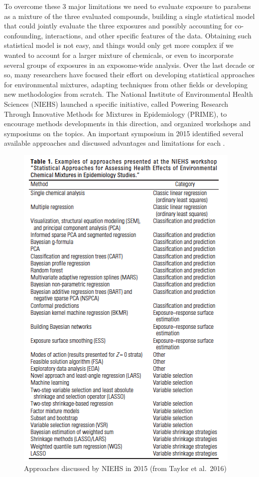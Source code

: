 \documentclass[
]{book}
\begin{document}
To overcome these 3 major limitations we need to evaluate exposure to parabens as a mixture of the three evaluated compounds, building a single statistical model that could jointly evaluate the three exposures and possibly accounting for co-confounding, interactions, and other specific features of the data. Obtaining such statistical model is not easy, and things would only get more complex if we wanted to account for a larger mixture of chemicals, or even to incorporate several groups of exposures in an exposome-wide analysis. Over the last decade or so, many researchers have focused their effort on developing statistical approaches for environmental mixtures, adapting techniques from other fields or developing new methodologies from scratch. The National Institute of Environmental Health Sciences (NIEHS) launched a specific initiative, called Powering Research Through Innovative Methods for Mixtures in Epidemiology (PRIME), to encourage methods developments in this direction, and organized workshops and symposiums on the topics. An important symposium in 2015 identified several available approaches and discussed advantages and limitations for each \citep{taylor2016statistical}.

\begin{figure}
\centering
\includegraphics{images/table.png}
\caption{Approaches discussed by NIEHS in 2015 (from Taylor et al.~2016)}
\end{figure}
\end{document}
